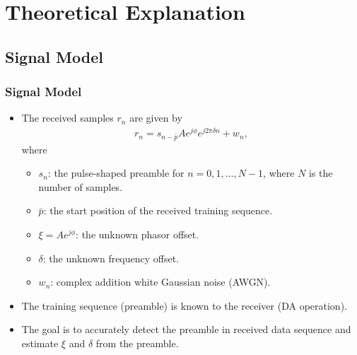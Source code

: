 \section{Theoretical Explanation}

\subsection{Signal Model}

\begin{frame}
  \frametitle{Signal Model}
  \begin{itemize}
    \item The received samples $r_n$ are given by
    \begin{equation*}
      \begin{aligned}
        \label{eq:model}
        r_n = s_{n-\bar{p}}Ae^{j\phi}e^{j2\pi\delta n}+w_{n},
      \end{aligned}
    \end{equation*}
    where
    \begin{itemize}
        \item $s_n$: the pulse-shaped preamble for $n=0,1,\ldots,N{-}1$, where $N$ is the number of samples.
        \item $\bar{p}$: the start position of the received training sequence.
        \item $\xi=Ae^{j\phi}$: the unknown phasor offset.
        \item $\delta$: the unknown frequency offset.
        \item $w_n$: complex addition white Gaussian noise (AWGN).
    \end{itemize}
    \item The training sequence (preamble) is known to the receiver (DA operation). 
    \item The goal is to accurately detect the preamble in received data sequence and estimate $\xi$ and $\delta$ from the preamble.
\end{itemize}
  
\end{frame}

